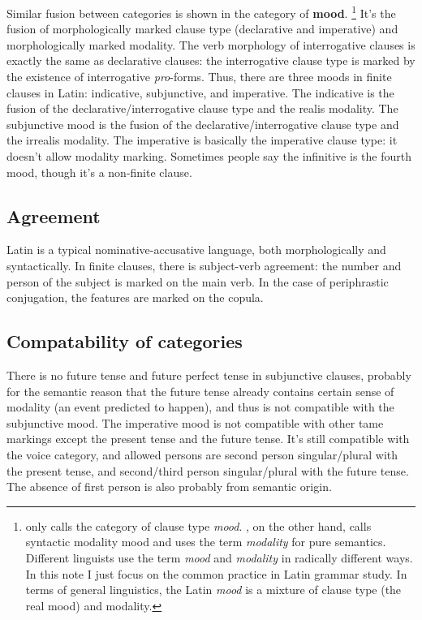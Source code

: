 \documentclass[a4paper, oneside, 12pt]{report}
\newcommand*{\concept}[1]{\textbf{#1}}
\newcommand*{\term}[1]{\emph{#1}}
\begin{document}
Similar fusion between categories is shown in the category of \concept{mood}.%
\footnote{
    \citet{dixon2009basic1} only calls the category of clause type \term{mood}.
    \citet{cgel}, on the other hand, 
    calls syntactic modality mood 
    and uses the term \term{modality} for pure semantics.
    Different linguists use the term \term{mood} and \term{modality} in radically different ways.
    In this note I just focus on the common practice in Latin grammar study.
    In terms of general linguistics, 
    the Latin \term{mood} is a mixture of clause type (the real mood)
    and modality.
}
It's the fusion of morphologically marked clause type 
(declarative and imperative)
and morphologically marked modality.
The verb morphology of interrogative clauses is exactly the same as declarative clauses:
the interrogative clause type is marked by the existence of interrogative \term{pro}-forms.
Thus, there are three moods in finite clauses in Latin:
\acl{indicative}, \acl{subjunctive}, and \acl{imperative}.
The \acl{indicative} is the fusion of 
the declarative/interrogative clause type and the realis modality.
The \acl{subjunctive} mood is the fusion of 
the declarative/interrogative clause type and the irrealis modality.
The \acl{imperative} is basically the imperative clause type:
it doesn't allow modality marking.
Sometimes people say the infinitive is the fourth mood,
though it's a non-finite clause.


\subsection{Agreement}\label{sec:agreement-abs}

Latin is a typical nominative-accusative language,
both morphologically and syntactically.
In finite clauses, 
there is subject-verb agreement:
the number and person of the subject is marked on the main verb.
In the case of periphrastic conjugation,
the features are marked on the copula.

\subsection{Compatability of categories}

There is no \acl{future} tense and \acl{future perfect} tense in subjunctive clauses,
probably for the semantic reason
that the future tense already contains certain sense of modality
(an event predicted to happen),
and thus is not compatible with the \acl{subjunctive} mood.
The \acl{imperative} mood is not compatible with other \ac{tame} markings
except the \acl{present} tense and the \acl{future} tense.
It's still compatible with the voice category,
and allowed persons are 
second person singular/plural with the \acl{present} tense,
and second/third person singular/plural with the \acl{future} tense.
The absence of first person is also probably from semantic origin.
\end{document}
